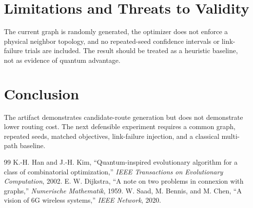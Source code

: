 \documentclass[sigconf]{acmart}
\begin{document}
\section{Limitations and Threats to Validity}

The current graph is randomly generated, the optimizer does not enforce a physical neighbor topology, and no repeated-seed confidence intervals or link-failure trials are included. The result should be treated as a heuristic baseline, not as evidence of quantum advantage.

\section{Conclusion}

The artifact demonstrates candidate-route generation but does not demonstrate lower routing cost. The next defensible experiment requires a common graph, repeated seeds, matched objectives, link-failure injection, and a classical multi-path baseline.

\begin{thebibliography}{99}
 K.-H. Han and J.-H. Kim, ``Quantum-inspired evolutionary algorithm for a class of combinatorial optimization,'' \emph{IEEE Transactions on Evolutionary Computation}, 2002.
 E. W. Dijkstra, ``A note on two problems in connexion with graphs,'' \emph{Numerische Mathematik}, 1959.
 W. Saad, M. Bennis, and M. Chen, ``A vision of 6G wireless systems,'' \emph{IEEE Network}, 2020.
\end{thebibliography}
\end{document}
